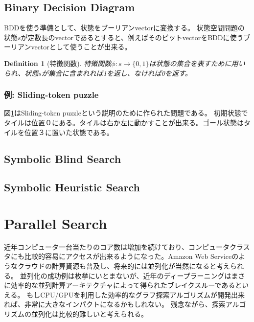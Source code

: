 \documentclass{report}
\newtheorem{definition}{Definition}
\begin{document}
\subsection{Binary Decision Diagram}

BDDを使う準備として、状態をブーリアンvectorに変換する。
状態空間問題の状態$s$が定数長のvectorであるとすると、例えばそのビットvectorをBDDに使うブーリアンvectorとして使うことが出来る。

\begin{definition}[特徴関数]
特徴関数$\phi: s \rightarrow \{0, 1\}$は状態の集合を表すために用いられ、状態$s$が集合に含まれれば1を返し、なければ0を返す。
\end{definition}


\subsubsection{例: Sliding-token puzzle}

図\ref{fig:sliding-token}はSliding-token puzzleという説明のために作られた問題である。
初期状態でタイルは位置０にある。タイルは右か左に動かすことが出来る。ゴール状態はタイルを位置３に置いた状態である。

\begin{figure}
\label{fig:sliding-token}
\end{figure}


\subsection{Symbolic Blind Search}


\subsection{Symbolic Heuristic Search}


\section{Parallel Search}
近年コンピュータ一台当たりのコア数は増加を続けており、コンピュータクラスタにも比較的容易にアクセスが出来るようになった。Amazon Web Serviceのようなクラウドの計算資源も普及し、将来的には並列化が当然になると考えられる。
並列化の成功例は枚挙にいとまないが、近年のディープラーニングはまさに効率的な並列計算アーキテクチャによって得られたブレイクスルーであるといえる。
もしCPU/GPUを利用した効率的なグラフ探索アルゴリズムが開発出来れば、非常に大きなインパクトになるかもしれない。
残念ながら、探索アルゴリズムの並列化は比較的難しいと考えられる。
\end{document}
